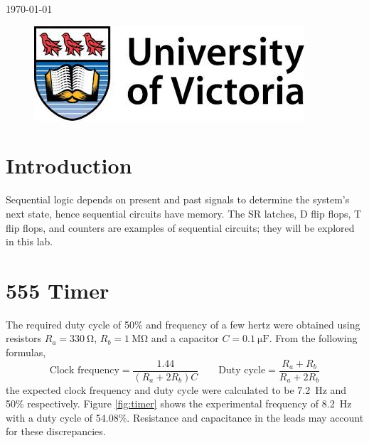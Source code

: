 \documentclass[11pt]{article}
\begin{document}
\begin{titlepage}
{\large \today}\\ %

\begin{figure}[b]	 %
	\centering
	\includegraphics[scale=0.3]{UVic_logo}
\end{figure}

\end{titlepage}


\section{Introduction}

Sequential logic depends on present and past signals to determine the system's next state, hence sequential circuits have memory. The SR latches, D flip flops, T flip flops, and counters are examples of sequential circuits; they will be explored in this lab.

\section{555 Timer}

The required duty cycle of 50\% and frequency of a few hertz were obtained using resistors $R_a = \SI{330}{\ohm}$, $R_b = \SI{1}{\mega\ohm}$  and a capacitor $C = \SI{0.1}{\micro\farad}$. From the following formulas,
\begin{displaymath}
\text{Clock frequency} = \frac{1.44}{\left( R_a + 2R_b \right)C} 
\quad \quad
\text{Duty cycle} = \frac{R_a + R_b}{R_a + 2R_b}
\end{displaymath}
the expected clock frequency and duty cycle were calculated to be \SI{7.2}{\hertz} and 50\% respectively. Figure \ref{fig:timer} shows the experimental frequency of \SI{8.2}{\hertz} with a duty cycle of 54.08\%. Resistance and capacitance in the leads may account for these discrepancies.
\end{document}

